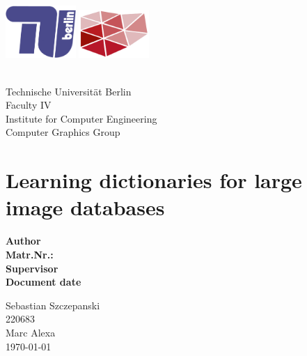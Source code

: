 
\thispagestyle{empty}
\includegraphics[width=0.2\textwidth]{images/logo/tu-logo_2d_blau.png}
\hfill
\includegraphics[width=0.2\textwidth]{images/logo/dgm_red.pdf}\\
\vspace{20pt}\\
\begin{center}
Technische Universit\"{a}t Berlin\\
Faculty IV\\
Institute for Computer Engineering\\
Computer Graphics Group
\vfill
\section*{\LARGE Learning dictionaries for large image databases}
\vfill
\begin{minipage}[t]{0.48\textwidth}
\flushright
\textbf{Author}\\
\textbf{Matr.Nr.:}\\
\textbf{Supervisor}\\
\textbf{Document date}
\end{minipage}
\begin{minipage}[t]{0.48\textwidth}
\flushleft 
Sebastian Szczepanski\\
220683\\
Marc Alexa\\
\today{}
\end{minipage}
\end{center}

\clearpage




